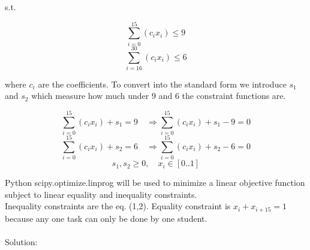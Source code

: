 \documentclass[12pt]{article}         %
\begin{document}
s.t.

\begin{equation}
 \sum_{i=0}^{15} ( c_i x_i) \le 9 
\end{equation}
\begin{equation}
\sum_{i=16}^{30} ( c_i x_i) \le 6 
\end{equation}

\noindent where $c_i$ are the coefficients. To convert into the standard form we introduce $s_1$ and $s_2$ which measure how much under $9$ and $6$ the constraint functions are.

$$
 \sum_{i=0}^{15} ( c_i x_i) + s_1 = 9 \quad\Rightarrow
 \sum_{i=0}^{15} ( c_i x_i) + s_1 - 9 = 0
$$
$$
 \sum_{i=0}^{15} ( c_i x_i) + s_2 = 6\quad\Rightarrow
 \sum_{i=0}^{15} ( c_i x_i) + s_2 - 6 = 0
$$
$$
s_1, s_2 \ge 0, \quad x_i \in [0 .. 1]
$$

Python scipy.optimize.linprog %
will be used to minimize a linear objective function subject to linear equality and inequality constraints. \\
Inequality constraints are the eq. (1,2). Equality constraint is $x_i + x_{i+15} = 1$ because any one task can only be done by one student.
\\ \\
Solution:
\end{document}
